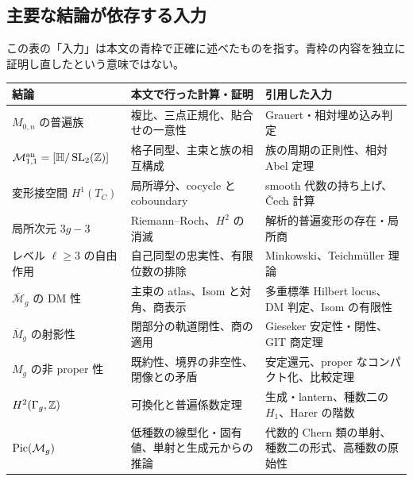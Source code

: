 \documentclass[dvipdfmx,a4paper,11pt]{article}
\theoremstyle{definition}
\DeclareMathOperator{\SL}{SL}\DeclareMathOperator{\PGL}{PGL}\DeclareMathOperator{\PSL}{PSL}
\newcommand{\cM}{\overline{\mathcal M}}
\begin{document}
\subsection{主要な結論が依存する入力}
この表の「入力」は本文の青枠で正確に述べたものを指す。青枠の内容を独立に証明し直したという意味ではない。
\small
\begin{longtable}{p{}p{}p{}}
\toprule
結論 & 本文で行った計算・証明 & 引用した入力\\
\midrule\endhead
$M_{0,n}$ の普遍族 & 複比、三点正規化、貼合せの一意性 & Grauert・相対埋め込み判定\\
$\MM_{1,1}^{\rm an}=[\HH/\SL_2(\Z)]$ & 格子同型、主束と族の相互構成 & 族の周期の正則性、相対 Abel 定理\\
変形接空間 $H^1(T_C)$ & 局所導分、cocycle と coboundary & smooth 代数の持ち上げ、Čech 計算\\
局所次元 $3g-3$ & Riemann--Roch、$H^2$ の消滅 & 解析的普遍変形の存在・局所商\\
レベル $\ell\ge3$ の自由作用 & 自己同型の忠実性、有限位数の排除 & Minkowski、Teichmüller 理論\\
$\cM_g$ の DM 性 & 主束の atlas、Isom と対角、商表示 & 多重標準 Hilbert locus、DM 判定、Isom の有限性\\
$\overline M_g$ の射影性 & 閉部分の軌道閉性、商の適用 & Gieseker 安定性・閉性、GIT 商定理\\
$M_g$ の非 proper 性 & 既約性、境界の非空性、閉像との矛盾 & 安定還元、proper なコンパクト化、比較定理\\
$H^2(\Gamma_g,\mathbb Z)$ & 可換化と普遍係数定理 & 生成・lantern、種数二の $H_1$、Harer の階数\\
$\operatorname{Pic}(\mathcal M_g)$ & 低種数の線型化・固有値、単射と生成元からの推論 & 代数的 Chern 類の単射、種数二の形式、高種数の原始性\\
\bottomrule
\end{longtable}
\normalsize
\end{document}
